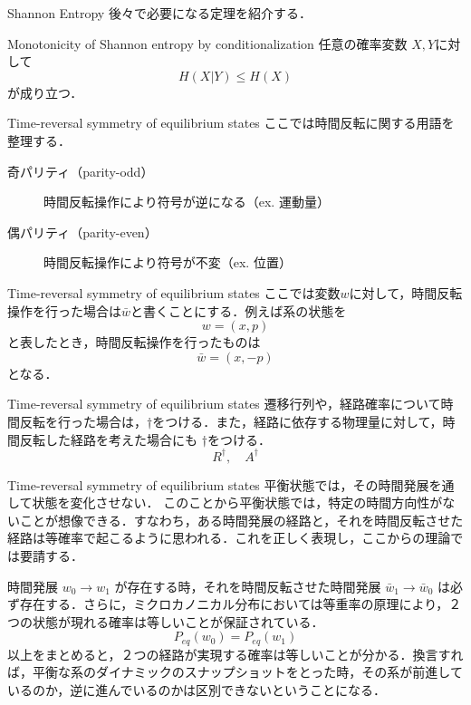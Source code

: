 \documentclass[aspectratio=169, dvipdfmx, 11pt,uplatex]{beamer} %
\begin{document}
\begin{frame}{Shannon Entropy}
  後々で必要になる定理を紹介する．
  \begin{block}{Monotonicity of Shannon entropy by conditionalization}
    任意の確率変数 $X, Y$に対して
    \begin{equation}
      H(X|Y) \leqslant  H(X)
    \end{equation}
    が成り立つ．
  \end{block}
\end{frame}

\begin{frame}{Time-reversal symmetry of equilibrium states}
  ここでは時間反転に関する用語を整理する．
  \begin{description}
    \item[奇パリティ（parity-odd）] 時間反転操作により符号が逆になる（ex. 運動量）
    \item[偶パリティ（parity-even）] 時間反転操作により符号が不変（ex. 位置）
  \end{description}
\end{frame}

\begin{frame}{Time-reversal symmetry of equilibrium states}
  ここでは変数$w$に対して，時間反転操作を行った場合は$\bar{w}$と書くことにする．例えば系の状態を
  \begin{equation}
    w = (x, p)
  \end{equation}
  と表したとき，時間反転操作を行ったものは
  \begin{equation}
    \bar{w} = (x, -p)
  \end{equation}
  となる．
\end{frame}

\begin{frame}{Time-reversal symmetry of equilibrium states}
  遷移行列や，経路確率について時間反転を行った場合は，$\dagger $をつける．また，経路に依存する物理量に対して，時間反転した経路を考えた場合にも $\dagger $をつける．
  \begin{equation}
    R^{\dagger }, \quad A^{\dagger }
  \end{equation}
\end{frame}

\begin{frame}{Time-reversal symmetry of equilibrium states}
  平衡状態では，その時間発展を通して状態を変化させない．
  このことから平衡状態では，特定の時間方向性がないことが想像できる．すなわち，ある時間発展の経路と，それを時間反転させた経路は等確率で起こるように思われる．これを正しく表現し，ここからの理論では要請する．\par 
  時間発展 $w_0 \to w_1$ が存在する時，それを時間反転させた時間発展 $\bar{w}_1 \to \bar{w}_0$ は必ず存在する．さらに，ミクロカノニカル分布においては等重率の原理により，２つの状態が現れる確率は等しいことが保証されている．
  \begin{equation}
    P_{eq} (w_0) = P_{eq} (w_1)
  \end{equation}
  以上をまとめると，２つの経路が実現する確率は等しいことが分かる．換言すれば，平衡な系のダイナミックのスナップショットをとった時，その系が前進しているのか，逆に進んでいるのかは区別できないということになる．
\end{frame}
\end{document}
